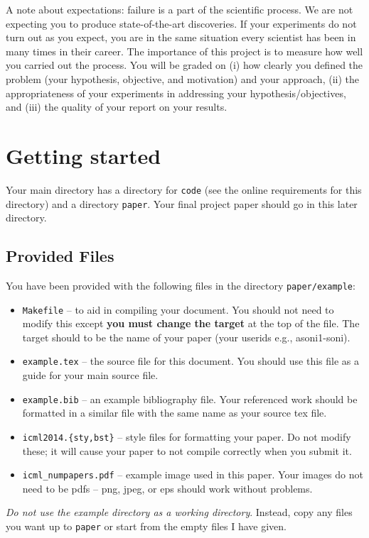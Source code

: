 \documentclass{article}
\begin{document}
A note about expectations: failure is a part of the scientific process.  We are
not expecting you to produce state-of-the-art discoveries.  If your experiments
do not turn out as you expect, you are in the same situation every scientist
has been in many times in their career. The importance of this project is
to measure how well you carried out the process.  You will be graded on (i) how
clearly you defined the problem (your hypothesis, objective, and motivation)
and your approach, (ii) the appropriateness of your experiments in addressing
your hypothesis/objectives, and (iii) the quality of your report on your results.

\section{Getting started}

Your main directory has a directory for {\tt code} (see the online requirements for this directory) and a directory {\tt paper}.  Your final project paper
should go in this later directory.

\subsection{Provided Files}

You have been provided with the following files in the directory {\tt paper/example}:
\begin{itemize}
  \item {\tt Makefile} -- to aid in compiling your document.  You should
    not need to modify this except {\bf you must change the target} at the top
    of the file.  The target should to be
    the name of your paper (your userids e.g., asoni1-soni).
  \item {\tt example.tex} -- the source file for this document.
    You should use this file as a guide for your main source file.
  \item {\tt example.bib} -- an example bibliography file.
    Your referenced work should be formatted in a similar file with the same
    name as your source tex file.
  \item {\tt icml2014.\{sty,bst\}} -- style files for formatting your paper.
    Do not modify these; it will cause your paper to not compile correctly when
    you submit it.
  \item {\tt icml\_numpapers.pdf} -- example image used in this paper.
    Your images do not need to be pdfs -- png, jpeg, or eps should work without problems.
\end{itemize}
{\em Do not use the example directory as a working directory}.  Instead, copy
any files you want up to {\tt paper} or start from the empty files I have given.
\end{document}
